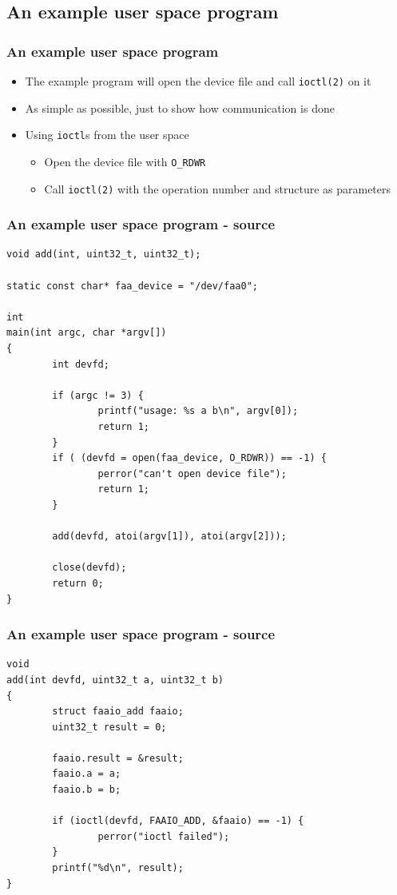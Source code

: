 \documentclass[dvipsnames,table]{beamer}
\begin{document}
\subsection{An example user space program}

\begin{frame}
\frametitle{An example user space program}
\begin{itemize}
	\item The example program will open the device file and call {\tt ioctl(2)} on it
	\item As simple as possible, just to show how communication is done
	\item Using {\tt ioctl}s from the user space
	\begin{itemize}
		\item Open the device file with {\tt O\_RDWR}
		\item Call {\tt ioctl(2)} with the operation number and structure as parameters
	\end{itemize}
\end{itemize}
\end{frame}

\begin{frame}[fragile]
\frametitle{An example user space program - source}
\begin{lstlisting}
void add(int, uint32_t, uint32_t);

static const char* faa_device = "/dev/faa0";

int
main(int argc, char *argv[])
{
        int devfd;

        if (argc != 3) {
                printf("usage: %s a b\n", argv[0]);
                return 1;
        }
        if ( (devfd = open(faa_device, O_RDWR)) == -1) {
                perror("can't open device file");
                return 1;
        }

        add(devfd, atoi(argv[1]), atoi(argv[2]));

        close(devfd);
        return 0;
}
\end{lstlisting}
\end{frame}

\begin{frame}[fragile]
\frametitle{An example user space program - source}
\begin{lstlisting}
void
add(int devfd, uint32_t a, uint32_t b)
{
        struct faaio_add faaio;
        uint32_t result = 0;

        faaio.result = &result;
        faaio.a = a;
        faaio.b = b;

        if (ioctl(devfd, FAAIO_ADD, &faaio) == -1) {
                perror("ioctl failed");
        }
        printf("%d\n", result);
}
\end{lstlisting}
\end{frame}
\end{document}
